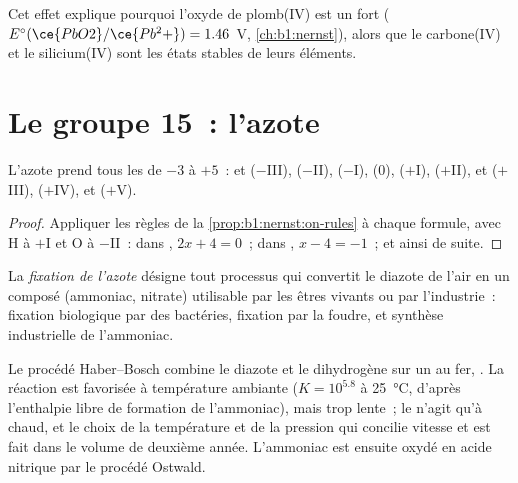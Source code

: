 Cet effet explique pourquoi l'oxyde de plomb(IV) est un  fort
($E^\circ(\ce{PbO2}/\ce{Pb^2+}) = 1.46$~V, \cref{ch:b1:nernst}), alors que
le carbone(IV) et le silicium(IV) sont les états stables de leurs
éléments.

\section{Le groupe 15~: l'azote}

\begin{proposition}\label{prop:b1:p-block-13-15:nitrogen-ladder}
L'azote prend tous les  de $-3$ à $+5$~:  et
 ($-$III),  ($-$II),  ($-$I),  (0),
 ($+$I),  ($+$II),  et  ($+$III),
 ($+$IV),  et  ($+$V).
\end{proposition}

\begin{proof}
Appliquer les règles de la \cref{prop:b1:nernst:on-rules} à chaque
formule, avec H à $+$I et O à $-$II~: dans , $2x + 4 = 0$~;
dans , $x - 4 =
-1$~; et ainsi de suite.
\end{proof}

\begin{definition}\label{def:b1:p-block-13-15:nitrogen-fixation}
La \emph{fixation de l'azote} désigne tout
processus qui convertit le diazote de l'air en un composé (ammoniac,
nitrate) utilisable par les êtres vivants ou par l'industrie~: fixation
biologique par des bactéries, fixation par la foudre, et synthèse
industrielle de l'ammoniac.
\end{definition}

Le procédé Haber--Bosch combine le diazote et le dihydrogène sur un
 au fer, . La réaction est favorisée à
température ambiante ($K = 10^{5.8}$ à \qty{25}{\celsius}, d'après
l'enthalpie libre de formation de l'ammoniac), mais trop lente~; le
 n'agit qu'à chaud, et le choix de la température et de la
pression qui concilie vitesse et  est fait dans le volume de
deuxième année. L'ammoniac est ensuite oxydé en acide nitrique par le
procédé Ostwald.

